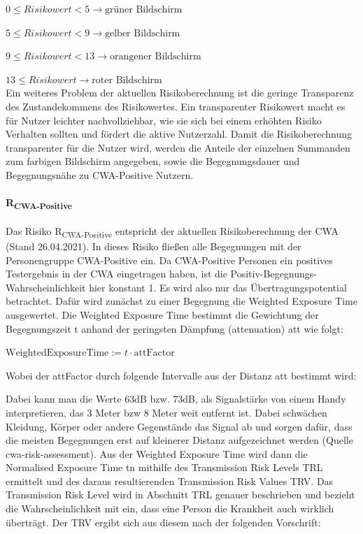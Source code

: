 \documentclass[conference]{IEEEtran}
\begin{document}
$0\le Risikowert < 5 \rightarrow \text{grüner Bildschirm}$

$5\le Risikowert < 9 \rightarrow \text{gelber Bildschirm}$

$9\le Risikowert < 13 \rightarrow \text{orangener Bildschirm}$

$13 \le Risikowert  \rightarrow \text{roter Bildschirm}$
\\
Ein weiteres Problem der aktuellen Risikoberechnung ist die geringe Transparenz des Zustandekommens des Risikowertes.
Ein transparenter Risikowert macht es für Nutzer leichter nachvollziehbar, wie sie sich bei einem erhöhten Risiko Verhalten sollten und fördert die aktive Nutzerzahl.
Damit die Risikoberechnung transparenter für die Nutzer wird, werden die Anteile der einzelnen Summanden zum farbigen Bildschirm angegeben, 
sowie die Begegnungsdauer und Begegnungsnähe zu CWA-Positive Nutzern.

\paragraph{R\textsubscript{CWA-Positive}}

Das Risiko R\textsubscript{CWA-Positive} entspricht der aktuellen Risikoberechnung der CWA (Stand 26.04.2021). 
In dieses Risiko fließen alle Begegnungen mit der Personengruppe CWA-Positive ein. 
Da CWA-Positive Personen ein positives Testergebnis in der CWA eingetragen haben, ist die Positiv-Begegnungs-Wahrscheinlichkeit hier konstant 1. 
Es wird also nur das Übertragungspotential betrachtet. Dafür wird zunächst zu einer Begegnung die Weighted Exposure Time ausgewertet. 
Die Weighted Exposure Time bestimmt die Gewichtung der Begegnungszeit t anhand der geringsten Dämpfung (attenuation) att  wie folgt: 

\centerline{\text{ }}
\centerline{$\text{WeightedExposureTime} := t \cdot \text{attFactor}$}
\centerline{\text{ }}

Wobei der attFactor durch folgende Intervalle aus der Distanz att bestimmt wird:

\centerline{\text{ }}




\centerline{\text{ }}

Dabei kann man die Werte 63dB bzw. 73dB, als Signalstärke von einem Handy interpretieren, das 3 Meter bzw 8 Meter weit entfernt ist. 
Dabei schwächen Kleidung, Körper oder andere Gegenstände das Signal ab und sorgen dafür, dass die meisten Begegnungen erst auf kleinerer Distanz aufgezeichnet werden (Quelle cwa-risk-assessment).
Aus der Weighted Exposure Time wird dann die Normalised Exposure Time t­n mithilfe des Transmission Risk Levels TRL ermittelt und des daraus resultierenden Transmission Risk Values TRV. 
Das Transmission Risk Level wird in Abschnitt TRL genauer beschrieben und bezieht die Wahrscheinlichkeit mit ein, dass eine Person die Krankheit auch wirklich überträgt. 
Der TRV ergibt sich aus diesem nach der folgenden Vorschrift:
\end{document}
